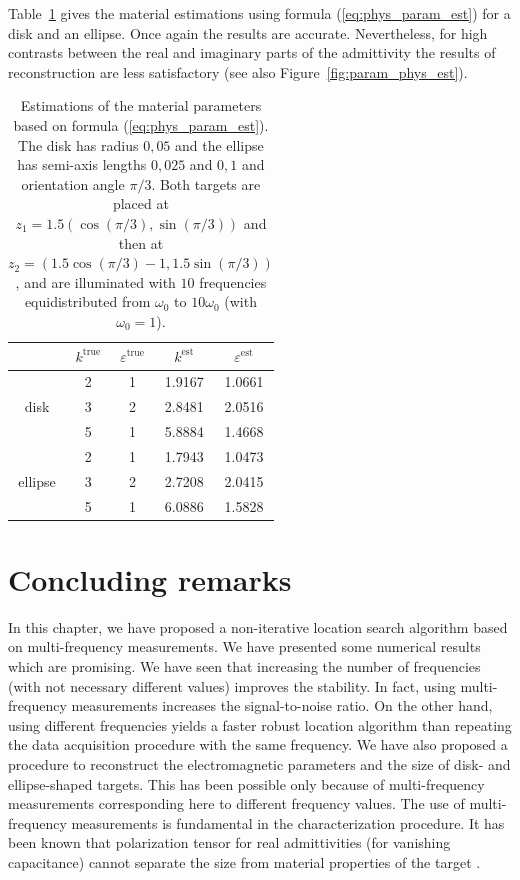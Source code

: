 Table~\ref{tab:param_phys_est} gives the material estimations
using formula (\ref{eq:phys_param_est}) for a disk and an ellipse.
Once again the results are accurate. Nevertheless, for high
contrasts between the real and imaginary parts of the 
admittivity the results of reconstruction are less satisfactory
(see also Figure~\ref{fig:param_phys_est}).

\begin{table}[!h]
\centering%
\begin{tabular}{|c||c|c||c|c|}
\cline{2-5} \multicolumn{1}{c|}{} & $k^{\textrm{true}}$ &
$\varepsilon^{\textrm{true}}$ & $k^{\textrm{est}}$ & $\varepsilon^{\textrm{est}}$
\tabularnewline \hline
 & 2 & 1 & 1.9167 & 1.0661\tabularnewline
\cline{2-5} disk & 3 & 2 & 2.8481 & 2.0516\tabularnewline
\cline{2-5}
 & 5 & 1 & 5.8884 & 1.4668\tabularnewline
\hline \hline
 & 2 & 1 & 1.7943 & 1.0473\tabularnewline
\cline{2-5} ellipse & 3 & 2 & 2.7208 & 2.0415\tabularnewline
\cline{2-5}
 & 5 & 1 & 6.0886 & 1.5828\tabularnewline
\hline
\end{tabular}

\caption{\label{tab:param_phys_est}Estimations of the material
parameters based on formula (\ref{eq:phys_param_est}). The disk
has radius $0,05$ and the ellipse has semi-axis lengths $0,025$
and $0,1$ and orientation angle $\pi/3$. Both targets are placed
at $z_{1}=1.5(\cos(\pi/3),\sin(\pi/3))$ and then at
$z_{2}=(1.5\cos(\pi/3)-1,1.5\sin(\pi/3))$, and are illuminated
with $10$ frequencies equidistributed from $\omega_0$ to $10
\omega_0$ (with $\omega_0=1$).}
\end{table}


\section{Concluding remarks}

In this chapter, we have proposed a non-iterative location
search algorithm based on multi-frequency measurements.  We have
presented some numerical results which are promising. We have seen
that increasing the number of frequencies (with not necessary
different values) improves the stability. In fact, using
multi-frequency measurements increases the signal-to-noise ratio.
On the other hand, using different frequencies yields a faster
robust location algorithm than repeating the data acquisition
procedure with the same frequency. We have also proposed a
procedure to reconstruct the electromagnetic parameters and the
size of disk- and ellipse-shaped targets. This has been possible
only because of multi-frequency measurements corresponding here to
different frequency values. The use of multi-frequency
measurements is fundamental in the characterization procedure. It
has been known that polarization tensor for real admittivities
(\ie for vanishing capacitance)
cannot separate the size from material properties of the target
\cite{ammari2007polarization}.

